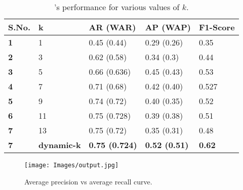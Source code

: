 \begin{table}[h]
\centering
\caption{\methodName's performance  for various values of $k$.}

\begin{tabular}{|l|l|l|l|l|}
\hline
\textbf{S.No.} & \textbf{k}          & \textbf{AR (WAR)} & \textbf{AP (WAP)} & \textbf{F1-Score} \\ \hline
\textbf{1}     & 1                                         & 0.45 (0.44) & 0.29 (0.26)                   & 0.35              \\ \hline
\textbf{2}     & 3                                         & 0.62 (0.58)   & 0.34 (0.3)                & 0.44              \\ \hline
\textbf{3}     & 5                                       & 0.66 (0.636)       & 0.45 (0.43)                & 0.53               \\ \hline
\textbf{4}     & 7                                        & 0.71 (0.68)     & 0.42 (0.40)                & 0.527               \\ \hline\textbf{5}     & 9                                       & 0.74 (0.72)     & 0.40 (0.35)           & 0.52              \\ \hline
\textbf{6}     & 11                                       & 0.75 (0.728)  & 0.39 (0.38)                   & 0.51              \\ \hline
\textbf{7}     & 13                                         & 0.75 (0.72)      & 0.35 (0.31)              & 0.48              \\ \hline
\textbf{7}     & \textbf{dynamic-k}               & \textbf{0.75 (0.724)}   & \textbf{0.52 (0.51)}         & \textbf{0.62}     \\ \hline
\end{tabular}
\label{tab:results3}
\end{table}

\begin{figure}[h!]
    \centering
    \texttt{[image: Images/output.jpg]}
    \caption{Average precision vs average recall curve.}
    \label{fig:pr-curve}
\end{figure}

